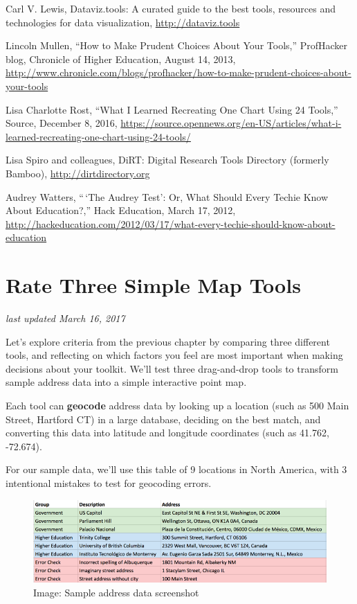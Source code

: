 \documentclass[
  english,
]{book}
\begin{document}
Carl V. Lewis, Dataviz.tools: A curated guide to the best tools, resources and technologies for data visualization, \url{http://dataviz.tools}

Lincoln Mullen, ``How to Make Prudent Choices About Your Tools,'' ProfHacker blog, Chronicle of Higher Education, August 14, 2013, \url{http://www.chronicle.com/blogs/profhacker/how-to-make-prudent-choices-about-your-tools}

Lisa Charlotte Rost, ``What I Learned Recreating One Chart Using 24 Tools,'' Source, December 8, 2016, \url{https://source.opennews.org/en-US/articles/what-i-learned-recreating-one-chart-using-24-tools/}

Lisa Spiro and colleagues, DiRT: Digital Research Tools Directory (formerly Bamboo), \url{http://dirtdirectory.org}

Audrey Watters, ``\,`The Audrey Test': Or, What Should Every Techie Know About Education?,'' Hack Education, March 17, 2012, \url{http://hackeducation.com/2012/03/17/what-every-techie-should-know-about-education}

\hypertarget{rate}{%
\section{Rate Three Simple Map Tools}\label{rate}}

\emph{last updated March 16, 2017}

Let's explore criteria from the previous chapter by comparing three different tools, and reflecting on which factors you feel are most important when making decisions about your toolkit. We'll test three drag-and-drop tools to transform sample address data into a simple interactive point map.

Each tool can \textbf{geocode} address data by looking up a location (such as 500 Main Street, Hartford CT) in a large database, deciding on the best match, and converting this data into latitude and longitude coordinates (such as 41.762, -72.674).

For our sample data, we'll use this table of 9 locations in North America, with 3 intentional mistakes to test for geocoding errors.

\begin{figure}
\centering
\includegraphics{images/01-choose/sample-address-screenshot.png}
\caption{Image: Sample address data screenshot}
\end{figure}
\end{document}
